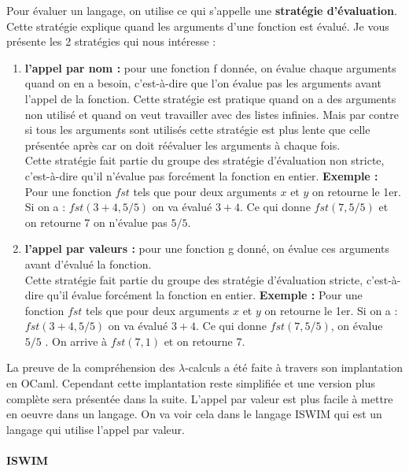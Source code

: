 \documentclass[10pt,a4paper]{article}
\begin{document}
				Pour évaluer un langage, on utilise ce qui s'appelle une \textbf{stratégie d'évaluation}. Cette stratégie explique quand les arguments d'une fonction est évalué. Je vous présente les 2 stratégies qui nous intéresse :
				\begin{enumerate}
					\item \textbf{l'appel par nom :} pour une fonction f donnée, on évalue chaque arguments quand on en a besoin, c'est-à-dire que l'on évalue pas les arguments avant l'appel de la fonction. Cette stratégie est pratique quand on a des arguments non utilisé  et quand on veut travailler avec des listes infinies. Mais par contre si tous les arguments sont utilisés cette stratégie est plus lente que celle présentée après car on doit réévaluer les arguments à chaque fois. 
					\\Cette stratégie fait partie du groupe des stratégie d'évaluation non stricte, c'est-à-dire qu'il n'évalue pas forcément la fonction en entier. 
					\smallbreak
					\textbf{Exemple :} Pour une fonction $fst$ tels que pour deux arguments $x$ et $y$ on retourne le 1er. Si on a : $fst(3+4,5/5)$ on va évalué $3+4$. Ce qui donne $fst(7,5/5)$ et on retourne 7 on n'évalue pas $5/5$.
					\item  \textbf{l'appel par valeurs :} pour une fonction g donné, on évalue ces arguments avant d'évalué la fonction.
					\\Cette stratégie fait partie du groupe des stratégie d'évaluation stricte, c'est-à-dire qu'il évalue forcément la fonction en entier.
					\smallbreak
					\textbf{Exemple :} Pour une fonction $fst$ tels que pour deux arguments $x$ et $y$ on retourne le 1er. Si on a : $fst(3+4,5/5)$ on va évalué $3+4$. Ce qui donne $fst(7,5/5)$, on évalue $5/5$ . On arrive à $fst(7,1)$ et on retourne 7.
				\end{enumerate}
				\medbreak
				
				La preuve de la compréhension des $\lambda$-calculs a été faite à travers son implantation en OCaml. Cependant cette implantation reste simplifiée et une version plus complète sera présentée dans la suite. 
				\smallbreak
				L'appel par valeur est plus facile à mettre en oeuvre dans un langage. On va voir cela dans le langage ISWIM qui est un langage qui utilise l'appel par valeur.
				\newpage
				
			
			
			\paragraph{ISWIM}	
			
\end{document}
